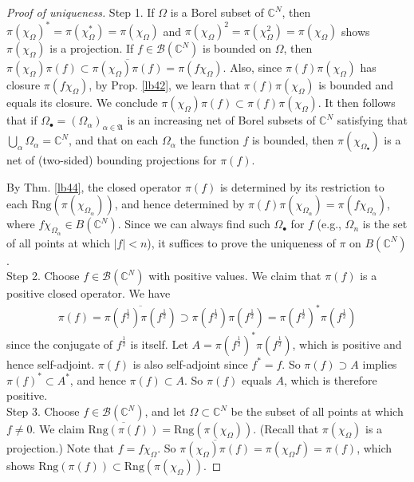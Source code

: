 \documentclass[12pt,b5paper,notitlepage]{article}
\theoremstyle{definition}
\theoremstyle{plain}
\newcommand{\fk}{\mathfrak}
\newcommand{\ovl}{\overline}
\newcommand{\scr}{\mathscr}
\newcommand{\blt}{\bullet}
\newcommand{\Cbb}{\mathbb C}
\newcommand{\Rng}{\mathrm{Rng}}
\numberwithin{equation}{section}
\begin{document}
\begin{proof}[Proof of uniqueness]
Step 1. If $\Omega$ is a Borel subset of $\Cbb^N$, then $\pi(\chi_\Omega)^*=\pi(\chi_\Omega^*)=\pi(\chi_\Omega)$ and $\pi(\chi_\Omega)^2=\pi(\chi_\Omega^2)=\pi(\chi_\Omega)$ shows $\pi(\chi_\Omega)$ is a projection. If $f\in\scr B(\Cbb^N)$ is bounded on $\Omega$, then $\pi(\chi_{\Omega})\pi(f)\subset \ovl{\pi(\chi_{\Omega})\pi(f)}=\pi(f\chi_\Omega)$. Also, since $\pi(f)\pi(\chi_\Omega)$ has closure $\pi(f\chi_\Omega)$, by Prop. \ref{lb42}, we learn that $\pi(f)\pi(\chi_\Omega)$ is bounded and equals its closure. We conclude $\pi(\chi_\Omega)\pi(f)\subset\pi(f)\pi(\chi_\Omega)$. It then follows that if $\Omega_\blt=(\Omega_\alpha)_{\alpha\in\fk A}$ is an increasing net of Borel subsets of $\Cbb^N$ satisfying that $\bigcup_\alpha \Omega_\alpha=\Cbb^N$, and that on each $\Omega_\alpha$ the function $f$ is bounded, then $\pi(\chi_{\Omega_\blt})$ is a net of (two-sided) bounding projections for $\pi(f)$. 

By Thm. \ref{lb44}, the closed operator $\pi(f)$ is determined by its restriction to each $\Rng(\pi(\chi_{\Omega_\alpha}))$, and hence determined by $\pi(f)\pi(\chi_{\Omega_\alpha})=\pi(f\chi_{\Omega_\alpha})$, where $f\chi_{\Omega_\alpha}\in B(\Cbb^N)$. Since we can always find such $\Omega_\blt$ for $f$ (e.g., $\Omega_n$ is the set of all points at which $|f|<n$),  it suffices to prove the uniqueness of $\pi$ on $B(\Cbb^N)$.\\[-1ex]




Step 2. Choose $f\in\scr B(\Cbb^N)$ with positive values. We claim that $\pi(f)$ is a positive closed operator. We have
\begin{align*}
	\pi(f)=\ovl{\pi(f^{\frac 12})\pi(f^{\frac 12})}\supset \pi(f^{\frac 12})\pi(f^{\frac 12})=\pi(f^{\frac 12})^*\pi(f^{\frac 12})
\end{align*}
since the conjugate of $f^{\frac 12}$ is itself. Let $A=\pi(f^{\frac 12})^*\pi(f^{\frac 12})$, which is positive and hence self-adjoint. $\pi(f)$ is also self-adjoint since $f^*=f$. So $\pi(f)\supset A$ implies $\pi(f)^*\subset A^*$, and hence $\pi(f)\subset A$. So $\pi(f)$ equals $A$, which is therefore positive.\\[-1ex]

Step 3. Choose $f\in\scr B(\Cbb^N)$, and let $\Omega\subset\Cbb^N$ be the subset of all points at which $f\neq 0$. We claim $\ovl{\Rng(\pi(f))}=\Rng(\pi(\chi_\Omega))$. (Recall that $\pi(\chi_\Omega)$ is a projection.) Note that $f=f\chi_\Omega$. So $\ovl {\pi(\chi_\Omega)\pi(f)}= \pi(\chi_\Omega f)=\pi(f)$, which shows $\Rng(\pi(f))\subset\Rng(\pi(\chi_\Omega))$.


\end{proof}
\end{document}
